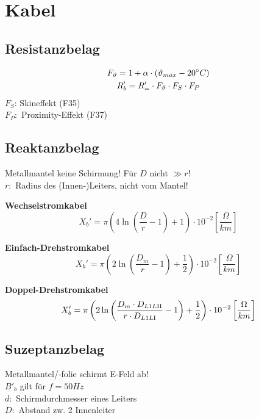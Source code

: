 \section{Kabel}

\subsection{Resistanzbelag}
\vspace{-2em}
\begin{gather*}
    F_\vartheta = 1+\alpha \cdot(\vartheta_{max} - 20\degree C)\\
    R'_b=R'_=\cdot F_\vartheta \cdot F_S \cdot F_P
\end{gather*}
$F_S$: Skineffekt (F35) \\
$F_P:$ Proximity-Effekt (F37)

\subsection{Reaktanzbelag}
Metallmantel keine Schirmung! Für $D$ nicht $\gg r$!\\
\indent $r:$ Radius des (Innen-)Leiters, nicht vom Mantel!

\textbf{Wechselstromkabel}
\begin{equation*}
    X_{b}' = \pi \left( 4 \ln \left( \frac{D}{r} -1\right) +1 \right) \cdot 10 ^{-2}   \left[\frac{\Omega}{km}\right]
\end{equation*}

\textbf{Einfach-Drehstromkabel}
\begin{equation*}
    X_{b}' = \pi \left( 2 \ln \left( \frac{D_{m}}{r} -1\right) +\frac{1}{2} \right) \cdot 10 ^{-2}   \left[\frac{\Omega}{km}\right]
\end{equation*}

\textbf{Doppel-Drehstromkabel}
\begin{equation*}
    X_{b}' = \pi \left( 2 \ln \left( \frac{D_{m} \cdot D_{L1L\RN{2}}}{r \cdot D_{L1L\RN{1}}} -1\right) +\frac{1}{2} \right) \cdot 10 ^{-2}   \left[\frac{\Omega}{km}\right]
\end{equation*}

\subsection{Suzeptanzbelag}
Metallmantel/-folie schirmt E-Feld ab!\\
\indent $B'_b$ gilt für $f=50Hz$\\
\indent $d:$ Schirmdurchmesser eines Leiters\\
\indent $D:$ Abstand zw. 2 Innenleiter

